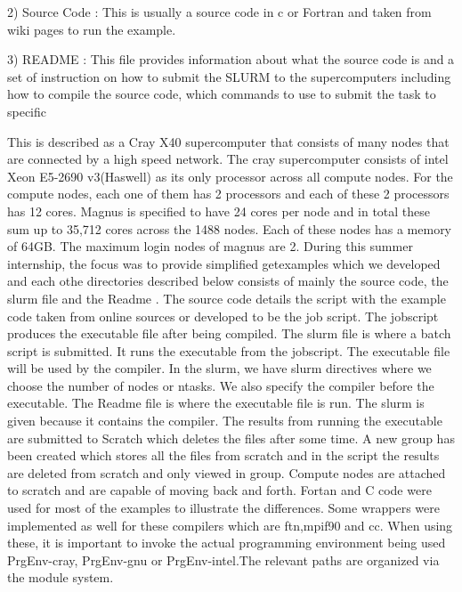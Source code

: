\begin{Document}
{2) Source Code : This is usually a source code in c or Fortran and taken from wiki pages to run the example.

3) README : This file provides information about what the source code is and a set of instruction on how to submit the SLURM to the supercomputers
including how to compile the source code, which commands to use to submit the task to specific 


This is described as a Cray X40 supercomputer that consists of many nodes that are connected by a high speed network. The cray supercomputer consists of intel Xeon E5-2690 v3(Haswell) as its only processor across all compute nodes. For the compute nodes, each one of them has 2 processors and each of these 2 processors has 12 cores.
Magnus is specified to have 24 cores per node and in total these sum up to 35,712 cores across the 1488 nodes. Each of these nodes has a memory of 64GB. The maximum login nodes of magnus are 2.
During this summer internship, the focus was to provide simplified getexamples which we developed and each othe directories described below consists of mainly the source code, the slurm file and the Readme . The source code details the script with the example code taken from online sources or developed to be the job script. The jobscript produces the executable file after being compiled. The slurm file is where a batch script is submitted. It runs the executable from the jobscript. The executable file will be used by the compiler. In the slurm, we have slurm directives where we choose the number of nodes or ntasks. We also specify the compiler before the executable. The Readme file is where the executable file is run. The slurm is given because it contains the compiler. The results from running the executable are submitted to Scratch which deletes the files after some time. A new group has been created which stores all the files from scratch and in the script the results are deleted from scratch and only viewed in group. Compute nodes are attached to scratch and are capable of moving back and forth.
Fortan and C code were used for most of the examples to illustrate the differences. Some wrappers were implemented as well for these compilers which are ftn,mpif90 and cc. When using these, it is important to invoke the actual programming environment being used PrgEnv-cray, PrgEnv-gnu or PrgEnv-intel.The relevant paths are organized via the module system.



}
\end{Document}
